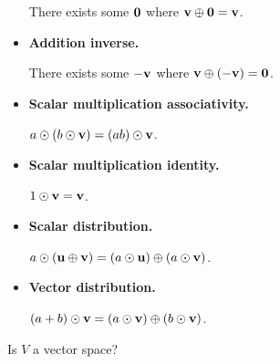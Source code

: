 \begin{applicationActivities}
\begin{activity}{25}
\begin{subactivity}
\begin{multicols}{2}
\begin{itemize}
            There exists some \(\mathbf 0\)
            where \(\mathbf v\oplus\mathbf 0=\mathbf v\).
      \item \textbf{Addition inverse.}

            There exists some \(-\mathbf v\)
            where \(\mathbf v\oplus(-\mathbf v)=\mathbf 0\).
      \item \textbf{Scalar multiplication associativity.}

            \(a\odot(b\odot\mathbf v)=(ab)\odot\mathbf v\).
      \item \textbf{Scalar multiplication identity.}

            \(1\odot\mathbf v=\mathbf v\).
      \item \textbf{Scalar distribution.}

            \(a\odot(\mathbf u\oplus\mathbf v)=
            (a\odot\mathbf u)\oplus (a\odot\mathbf v)\).
      \item \textbf{Vector distribution.}

            \((a+b)\odot\mathbf v=(a\odot\mathbf v)\oplus (b\odot\mathbf v)\).
    \end{itemize}
    \end{multicols}
  \end{subactivity}

  \begin{subactivity}
    Is \(V\) a vector space?
  \end{subactivity}
\end{activity}



\end{applicationActivities}
